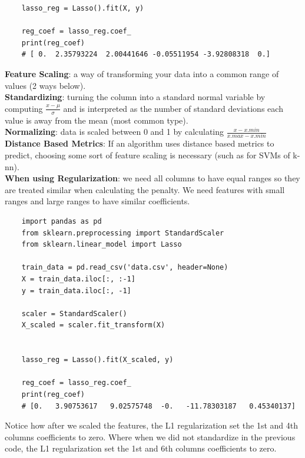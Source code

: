 \documentclass[11pt, a4paper]{article}
\begin{document}
\begin{spacing}{1.1}
\begin{lstlisting}
	lasso_reg = Lasso().fit(X, y)
	
	reg_coef = lasso_reg.coef_
	print(reg_coef)
	# [ 0.  2.35793224  2.00441646 -0.05511954 -3.92808318  0.]	\end{lstlisting}\vspace*{3mm}
	\textbf{Feature Scaling}: a way of transforming your data into a common range of values (2 ways below).\vspace*{2mm}\\
	\textbf{Standardizing}: turning the column into a standard normal variable by computing $\frac{x-\mu}{\sigma}$ and is interpreted as the number of standard deviations each value is away from the mean (most common type).\vspace*{2mm}\\
	\textbf{Normalizing}: data is scaled between 0 and 1 by calculating $\frac{x-x.min}{x.max - x.min}$\vspace*{2mm}\\
	\textbf{Distance Based Metrics}: If an algorithm uses distance based metrics to predict, choosing some sort of feature scaling is necessary (such as for SVMs of k-nn).\vspace*{2mm}\\
	\textbf{When using Regularization}: we need all columns to have equal ranges so they are treated similar when calculating the penalty. We need features with small ranges and large ranges to have similar coefficients.
	\begin{lstlisting}
	import pandas as pd
	from sklearn.preprocessing import StandardScaler
	from sklearn.linear_model import Lasso
	
	train_data = pd.read_csv('data.csv', header=None)
	X = train_data.iloc[:, :-1]
	y = train_data.iloc[:, -1]
	
	scaler = StandardScaler()
	X_scaled = scaler.fit_transform(X)
	
	
	lasso_reg = Lasso().fit(X_scaled, y)
	
	reg_coef = lasso_reg.coef_
	print(reg_coef)
	# [0.   3.90753617   9.02575748  -0.   -11.78303187   0.45340137]	\end{lstlisting}\vspace*{3mm}
	Notice how after we scaled the features, the L1 regularization set the 1st and 4th columns coefficients to zero. Where when we did not standardize in the previous code, the L1 regularization set the 1st and 6th columns coefficients to zero. \newpage


\end{spacing}
\end{document}
